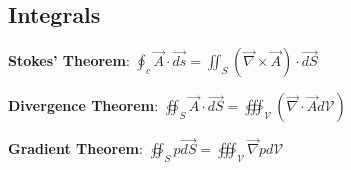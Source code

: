 \documentclass{article}
\begin{document}
\begin{multicols*}{2}
\subsection*{Integrals}
\textbf{Stokes' Theorem}: $\oint_c \vec{A}\cdot\vec{ds}=\iint_S(\vec{\nabla}\times\vec{A})\cdot\vec{dS}$\par 
\textbf{Divergence Theorem}: $\oiint_S\vec{A}\cdot\vec{dS}=\oiiint_\mathscr{V}(\vec{\nabla}\cdot\vec{A}d\mathscr{V})$\par 
\textbf{Gradient Theorem}: $\oiint_S p\vec{dS}=\oiiint_\mathscr{V} \vec{\nabla}pd\mathscr{V}$


\end{multicols*}  
\end{document}

